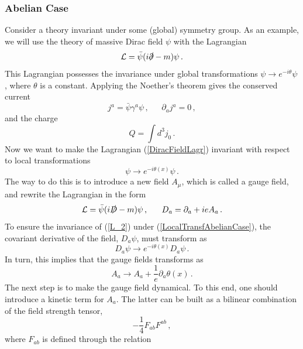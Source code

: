\documentclass[12pt]{article}
\begin{document}
\subsubsection{Abelian Case}
Consider a theory invariant under some (global) symmetry group. As an example, we will use the theory of massive Dirac field $\psi$ with the Lagrangian
\begin{equation}\label{DiracFieldLagr}
\mathcal{L}=\bar{\psi}(i\slashed{\partial}-m)\psi   \,.
\end{equation}
This Lagrangian possesses the invariance under global transformations $\psi\rightarrow e^{-i\theta}\psi$, where $\theta$ is a constant. Applying the Noether's theorem gives the conserved current
\begin{equation}\label{CurrentAbelianCase}
j^a=\bar{\psi}\gamma^a\psi  \,,~~~~~~~\partial_a j^a=0   \,,
\end{equation}
and the charge
\begin{equation}
Q=\int d^3 j_0   \,.
\end{equation}
Now we want to make the Lagrangian (\ref{DiracFieldLagr}) invariant with respect to local transformations
\begin{equation}\label{LocalTransfAbelianCase}
\psi\rightarrow e^{-i\theta(x)}\psi   \,.
\end{equation}
The way to do this is to introduce a new field $A_\mu$, which is called a gauge field, and rewrite the Lagrangian in the form
\begin{equation}\label{L_2}
\mathcal{L}=\bar{\psi}(i\slashed{D}-m)\psi   \,,~~~~~ D_a=\partial_a+ieA_a   \,.
\end{equation}
To ensure the invariance of (\ref{L_2}) under (\ref{LocalTransfAbelianCase}), the covariant derivative of the field, $D_a\psi$, must transform as
\begin{equation}
D_a\psi\rightarrow e^{-i\theta(x)}D_a\psi  \,.
\end{equation}
In turn, this implies that the gauge fields transforms as
\begin{equation}
A_a\rightarrow A_a +\dfrac{1}{e}\partial_a\theta(x)  \,.
\end{equation}
The next step is to make the gauge field dynamical. To this end, one should introduce a kinetic term for $A_a$. The latter can be built as a bilinear combination of the field strength tensor,
\begin{equation}\label{KineticTermAbelianCase}
-\dfrac{1}{4}F_{ab}F^{ab}   \,,
\end{equation}
where $F_{ab}$ is defined through the relation
\end{document}

